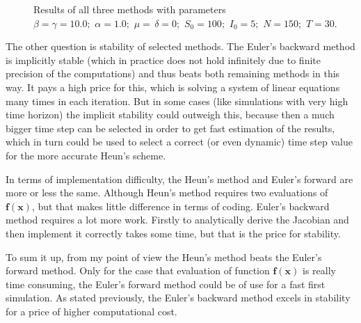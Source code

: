 \documentclass[a4paper]{article}
\begin{document}
\begin{figure}[h]
	\caption[Assignment case]{Results of all three methods with parameters $ \beta = \gamma = 10.0;\,\, \alpha = 1.0;\,\, \mu=\,\delta = 0;\,\, S_0 = 100;\,\, I_0 = 5;\,\, N = 150;\,\, T = 30. $}
	\label{fig:assignmentspecial}
\end{figure}


The other question is stability of selected methods. The Euler's backward method is implicitly stable (which in practice does not hold infinitely due to finite precision of the computations) and thus beats both remaining methods in this way. It pays a high price for this, which is solving a system of linear equations many times in each iteration. But in some cases (like simulations with very high time horizon) the implicit stability could outweigh this, because then a much bigger time step can be selected in order to get fast estimation of the results, which in turn could be used to select a correct (or even dynamic) time step value for the more accurate Heun's scheme.

In terms of implementation difficulty, the Heun's method and Euler's forward are more or less the same. Although Heun's method requires two evaluations of $ \textbf{f}(\textbf{x}) $, but that makes little difference in terms of coding. Euler's backward method requires a lot more work. Firstly to analytically derive the Jacobian and then implement it correctly takes some time, but that is the price for stability. 

To sum it up, from my point of view the Heun's method beats the Euler's forward method. Only for the case that evaluation of function $ \textbf{f}(\textbf{x}) $ is really time consuming, the Euler's forward method could be of use for a fast first simulation. As stated previously, the Euler's backward method excels in stability for a price of higher computational cost.
\end{document}
